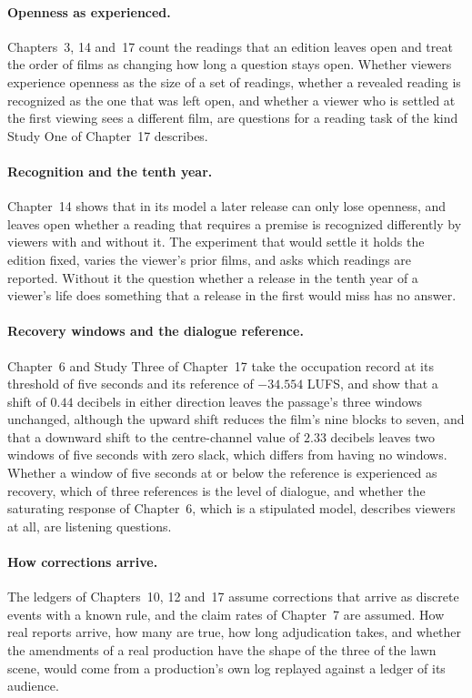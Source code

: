 \documentclass[11pt,twoside,openright]{book}
\theoremstyle{plain}
\theoremstyle{definition}
\theoremstyle{remark}
\begin{document}
\paragraph{Openness as experienced.} Chapters~3, 14 and~17 count the readings that an edition leaves open and treat the order of films as changing how long a question stays open. Whether viewers experience openness as the size of a set of readings, whether a revealed reading is recognized as the one that was left open, and whether a viewer who is settled at the first viewing sees a different film, are questions for a reading task of the kind Study One of Chapter~17 describes.

\paragraph{Recognition and the tenth year.} Chapter~14 shows that in its model a later release can only lose openness, and leaves open whether a reading that requires a premise is recognized differently by viewers with and without it. The experiment that would settle it holds the edition fixed, varies the viewer's prior films, and asks which readings are reported. Without it the question whether a release in the tenth year of a viewer's life does something that a release in the first would miss has no answer.

\paragraph{Recovery windows and the dialogue reference.} Chapter~6 and Study Three of Chapter~17 take the occupation record at its threshold of five seconds and its reference of $-34.554$ LUFS, and show that a shift of $0.44$ decibels in either direction leaves the passage's three windows unchanged, although the upward shift reduces the film's nine blocks to seven, and that a downward shift to the centre-channel value of $2.33$ decibels leaves two windows of five seconds with zero slack, which differs from having no windows. Whether a window of five seconds at or below the reference is experienced as recovery, which of three references is the level of dialogue, and whether the saturating response of Chapter~6, which is a stipulated model, describes viewers at all, are listening questions.

\paragraph{How corrections arrive.} The ledgers of Chapters~10, 12 and~17 assume corrections that arrive as discrete events with a known rule, and the claim rates of Chapter~7 are assumed. How real reports arrive, how many are true, how long adjudication takes, and whether the amendments of a real production have the shape of the three of the lawn scene, would come from a production's own log replayed against a ledger of its audience.
\end{document}

